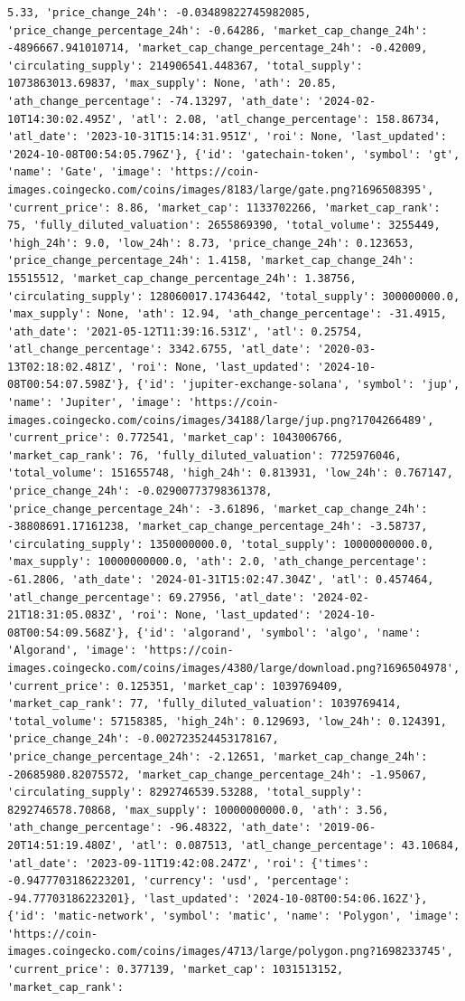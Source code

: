 \documentclass[
  letterpaper,
  DIV=11,
  numbers=noendperiod]{scrreprt}
\begin{document}
\begin{verbatim}
5.33, 'price_change_24h': -0.03489822745982085, 'price_change_percentage_24h': -0.64286, 'market_cap_change_24h': -4896667.941010714, 'market_cap_change_percentage_24h': -0.42009, 'circulating_supply': 214906541.448367, 'total_supply': 1073863013.69837, 'max_supply': None, 'ath': 20.85, 'ath_change_percentage': -74.13297, 'ath_date': '2024-02-10T14:30:02.495Z', 'atl': 2.08, 'atl_change_percentage': 158.86734, 'atl_date': '2023-10-31T15:14:31.951Z', 'roi': None, 'last_updated': '2024-10-08T00:54:05.796Z'}, {'id': 'gatechain-token', 'symbol': 'gt', 'name': 'Gate', 'image': 'https://coin-images.coingecko.com/coins/images/8183/large/gate.png?1696508395', 'current_price': 8.86, 'market_cap': 1133702266, 'market_cap_rank': 75, 'fully_diluted_valuation': 2655869390, 'total_volume': 3255449, 'high_24h': 9.0, 'low_24h': 8.73, 'price_change_24h': 0.123653, 'price_change_percentage_24h': 1.4158, 'market_cap_change_24h': 15515512, 'market_cap_change_percentage_24h': 1.38756, 'circulating_supply': 128060017.17436442, 'total_supply': 300000000.0, 'max_supply': None, 'ath': 12.94, 'ath_change_percentage': -31.4915, 'ath_date': '2021-05-12T11:39:16.531Z', 'atl': 0.25754, 'atl_change_percentage': 3342.6755, 'atl_date': '2020-03-13T02:18:02.481Z', 'roi': None, 'last_updated': '2024-10-08T00:54:07.598Z'}, {'id': 'jupiter-exchange-solana', 'symbol': 'jup', 'name': 'Jupiter', 'image': 'https://coin-images.coingecko.com/coins/images/34188/large/jup.png?1704266489', 'current_price': 0.772541, 'market_cap': 1043006766, 'market_cap_rank': 76, 'fully_diluted_valuation': 7725976046, 'total_volume': 151655748, 'high_24h': 0.813931, 'low_24h': 0.767147, 'price_change_24h': -0.02900773798361378, 'price_change_percentage_24h': -3.61896, 'market_cap_change_24h': -38808691.17161238, 'market_cap_change_percentage_24h': -3.58737, 'circulating_supply': 1350000000.0, 'total_supply': 10000000000.0, 'max_supply': 10000000000.0, 'ath': 2.0, 'ath_change_percentage': -61.2806, 'ath_date': '2024-01-31T15:02:47.304Z', 'atl': 0.457464, 'atl_change_percentage': 69.27956, 'atl_date': '2024-02-21T18:31:05.083Z', 'roi': None, 'last_updated': '2024-10-08T00:54:09.568Z'}, {'id': 'algorand', 'symbol': 'algo', 'name': 'Algorand', 'image': 'https://coin-images.coingecko.com/coins/images/4380/large/download.png?1696504978', 'current_price': 0.125351, 'market_cap': 1039769409, 'market_cap_rank': 77, 'fully_diluted_valuation': 1039769414, 'total_volume': 57158385, 'high_24h': 0.129693, 'low_24h': 0.124391, 'price_change_24h': -0.002723524453178167, 'price_change_percentage_24h': -2.12651, 'market_cap_change_24h': -20685980.82075572, 'market_cap_change_percentage_24h': -1.95067, 'circulating_supply': 8292746539.53288, 'total_supply': 8292746578.70868, 'max_supply': 10000000000.0, 'ath': 3.56, 'ath_change_percentage': -96.48322, 'ath_date': '2019-06-20T14:51:19.480Z', 'atl': 0.087513, 'atl_change_percentage': 43.10684, 'atl_date': '2023-09-11T19:42:08.247Z', 'roi': {'times': -0.9477703186223201, 'currency': 'usd', 'percentage': -94.77703186223201}, 'last_updated': '2024-10-08T00:54:06.162Z'}, {'id': 'matic-network', 'symbol': 'matic', 'name': 'Polygon', 'image': 'https://coin-images.coingecko.com/coins/images/4713/large/polygon.png?1698233745', 'current_price': 0.377139, 'market_cap': 1031513152, 'market_cap_rank': 
\end{verbatim}
\end{document}
